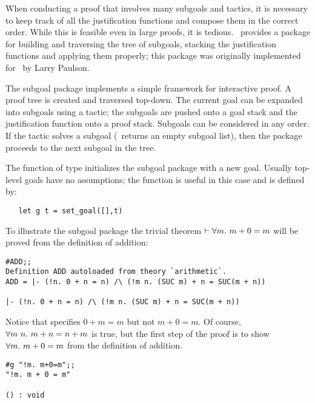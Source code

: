 When conducting a proof that involves many subgoals and tactics, it is necessary
to keep track of all the justification functions
and compose them in the correct order.  While
this is feasible even in large proofs, it is tedious.  \HOL\ provides a package
for building and traversing the tree of subgoals, stacking the justification functions and
applying them properly; this package was originally implemented for \LCF\ by
Larry Paulson.

The subgoal package implements a simple framework for interactive proof. A proof
tree is created and traversed top-down.  The current goal can be expanded
into subgoals using a tactic; the subgoals are pushed onto a goal
stack and the justification function onto a proof stack.
Subgoals can be considered in any order.  If the tactic solves a
subgoal (\ie\ returns an empty subgoal list), then the package proceeds to the
next subgoal in the tree.

The function   of type 
initializes the subgoal package with a new goal. Usually
top-level goals have no assumptions; the function  is useful
in this case and is defined by:

\begin{hol}\begin{verbatim}
   let g t = set_goal([],t)
\end{verbatim}\end{hol}

To illustrate the subgoal package the trivial theorem
$\vdash \forall m.\ m+0=m$ will be proved from the definition of addition:

\begin{session}\begin{verbatim}
#ADD;;
Definition ADD autoloaded from theory `arithmetic`.
ADD = |- (!n. 0 + n = n) /\ (!m n. (SUC m) + n = SUC(m + n))

|- (!n. 0 + n = n) /\ (!m n. (SUC m) + n = SUC(m + n))
\end{verbatim}\end{session}

\noindent Notice that  specifies
$0+m=m$ but not $m+0=m$. Of course, $\forall m\ n.\ m+n = n+m$ is true, but the first step of the proof is to show
$\forall m.\ m+0=m$ from the definition of addition.

\setcounter{sessioncount}{1}
\begin{session}\begin{verbatim}
#g "!m. m+0=m";;
"!m. m + 0 = m"

() : void
\end{verbatim}\end{session}

